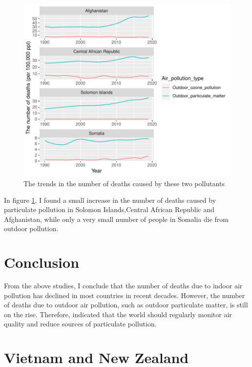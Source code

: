 \documentclass[11pt,a4paper,]{article}
\begin{document}
\begin{figure}[H]

{\centering \includegraphics{Assignment4_files/figure-latex/trendsfig-1} 

}

\caption{The trends in the number of deaths caused by these two pollutants}\label{fig:trendsfig}
\end{figure}

In figure \ref{fig:trendsfig}, I found a small increase in the number of deaths caused by particulate pollution in Solomon Islands,Central African Republic and Afghanistan, while only a very small number of people in Somalia die from outdoor pollution.

\hypertarget{conclusion}{%
\section{Conclusion}\label{conclusion}}

From the above studies, I conclude that the number of deaths due to indoor air pollution has declined in most countries in recent decades. However, the number of deaths due to outdoor air pollution, such as outdoor particulate matter, is still on the rise. Therefore, \textcite{neidell2004air} indicated that the world should regularly monitor air quality and reduce sources of particulate pollution.

\section*{Vietnam and New Zealand}
\end{document}
